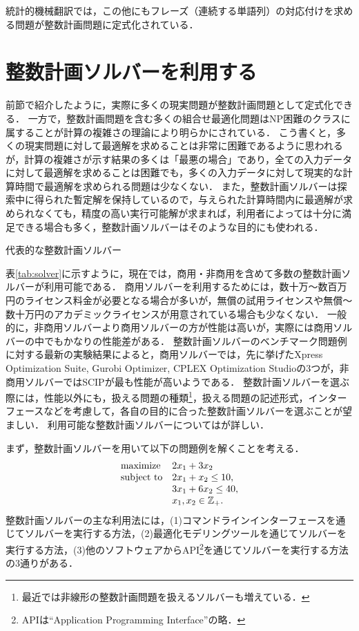 \documentclass[japanese]{jnlp_1.4}
\begin{document}
統計的機械翻訳では，この他にもフレーズ（連続する単語列）の対応付けを求める問題が整数計画問題に定式化されている\cite{DeNeroJ2008,KoshikawaM2010}．


\section{整数計画ソルバーを利用する}
\label{sec:solver}

前節で紹介したように，実際に多くの現実問題が整数計画問題として定式化できる．
一方で，整数計画問題を含む多くの組合せ最適化問題はNP困難のクラスに属することが計算の複雑さの理論により明らかにされている．
こう書くと，多くの現実問題に対して最適解を求めることは非常に困難であるように思われるが，計算の複雑さが示す結果の多くは「最悪の場合」であり，全ての入力データに対して最適解を求めることは困難でも，多くの入力データに対して現実的な計算時間で最適解を求められる問題は少なくない．
また，整数計画ソルバーは探索中に得られた暫定解を保持しているので，与えられた計算時間内に最適解が求められなくても，精度の高い実行可能解が求まれば，利用者によっては十分に満足できる場合も多く，整数計画ソルバーはそのような目的にも使われる．

\begin{table}[b]
\caption{代表的な整数計画ソルバー}
\label{tab:solver}

\end{table}

表\ref{tab:solver}に示すように，現在では，商用・非商用を含めて多数の整数計画ソルバーが利用可能である\cite{AtamturkA2005,LinderothJT2006,FourerR2013,MittelmannHD-Web}．
商用ソルバーを利用するためには，数十万〜数百万円のライセンス料金が必要となる場合が多いが，無償の試用ライセンスや無償〜数十万円のアカデミックライセンスが用意されている場合も少なくない．
一般的に，非商用ソルバーより商用ソルバーの方が性能は高いが，実際には商用ソルバーの中でもかなりの性能差がある．
整数計画ソルバーのベンチマーク問題例に対する最新の実験結果\cite{MittelmannHD-Web}によると，商用ソルバーでは，先に挙げたXpress Optimization Suite, Gurobi Optimizer, CPLEX Optimization Studioの3つが，非商用ソルバーではSCIPが最も性能が高いようである．
整数計画ソルバーを選ぶ際には，性能以外にも，扱える問題の種類\footnote{最近では非線形の整数計画問題を扱えるソルバーも増えている．}，扱える問題の記述形式，インターフェースなどを考慮して，各自の目的に合った整数計画ソルバーを選ぶことが望ましい．
利用可能な整数計画ソルバーについては\cite{FourerR2013,MittelmannHD-Web}が詳しい．

まず，整数計画ソルバーを用いて以下の問題例を解くことを考える．
\begin{equation}
\label{eq:sample}
\begin{array}{ll}
\textnormal{maximize} & 2 x_1 + 3 x_2 \\
\textnormal{subject to} & 2 x_1 +  x_2 \le 10,\\
& 3 x_1 + 6 x_2 \le 40,\\
& x_1, x_2 \in \mathbb{Z}_+.
\end{array}
\end{equation}
整数計画ソルバーの主な利用法には，(1)コマンドラインインターフェースを通じてソルバーを実行する方法，(2)最適化モデリングツールを通じてソルバーを実行する方法，(3)他のソフトウェアからAPI\footnote{APIは``Application Programming Interface''の略．}を通じてソルバーを実行する方法の3通りがある．
\end{document}
